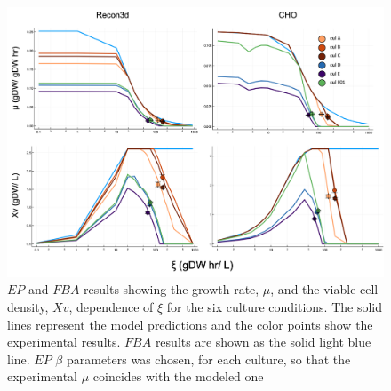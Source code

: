 	\begin{figure}[H]
		\includegraphics[scale = 0.5]{rich_medium_1}
		\caption{$EP$ and $FBA$ results showing the growth rate, $\mu$, and the viable cell density, $Xv$, dependence of $\xi$ for the six culture conditions. The solid lines represent the model predictions and the color points show the experimental results. $FBA$ results are shown as the solid light blue line. $EP$ $\beta$ parameters was chosen, for each culture, so that the experimental $\mu$ coincides with the modeled one}
		
	\end{figure}